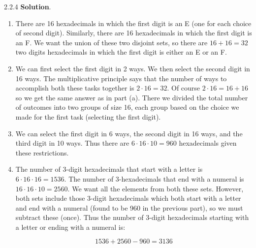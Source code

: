 \documentclass[11pt,]{book}
\theoremstyle{ptxplainnotitle}
\theoremstyle{ptxplaintitle}
\theoremstyle{ptxdefinitionnotitle}
\theoremstyle{ptxdefinitiontitle}
\theoremstyle{ptxdefinitionnotitle}
\theoremstyle{ptxdefinitiontitle}
\theoremstyle{ptxdefinitionnotitle}
\theoremstyle{ptxdefinitiontitle}
\theoremstyle{ptxdefinitiontitlenonumber}
\theoremstyle{ptxdefinitiontitlenonumber}
\numberwithin{equation}{chapter}
\begin{document}
\begin{divisionexercise}{2.2.4}
\textbf{Solution}.\quad%
\hypertarget{p-1081}{}%
\leavevmode%
\begin{enumerate}[label=\alph*.]
\item\hypertarget{li-472}{}\hypertarget{p-1082}{}%
There are 16 hexadecimals in which the first digit is an E (one for each choice of second digit). Similarly, there are 16 hexadecimals in which the first digit is an F. We want the union of these two disjoint sets, so there are \(16 + 16 = 32\) two digits hexadecimals in which the first digit is either an E or an F.%
\item\hypertarget{li-473}{}\hypertarget{p-1083}{}%
We can first select the first digit in 2 ways. We then select the second digit in 16 ways. The multiplicative principle says that the number of ways to accomplish both these tasks together is \(2 \cdot 16 = 32\text{.}\) Of course \(2 \cdot 16 = 16 + 16\) so we get the same answer as in part (a). There we divided the total number of outcomes into two groups of size 16, each group based on the choice we made for the first task (selecting the first digit).%
\item\hypertarget{li-474}{}\hypertarget{p-1084}{}%
We can select the first digit in 6 ways, the second digit in 16 ways, and the third digit in 10 ways. Thus there are \(6\cdot 16 \cdot 10 = 960\) hexadecimals given these restrictions.%
\item\hypertarget{li-475}{}\hypertarget{p-1085}{}%
The number of 3-digit hexadecimals that start with a letter is \(6 \cdot 16 \cdot 16 = 1536\text{.}\) The number of 3-hexadecimals that end with a numeral is \(16 \cdot 16 \cdot 10 = 2560\text{.}\) We want all the elements from both these sets. However, both sets include those 3-digit hexadecimals which both start with a letter and end with a numeral (found to be 960 in the previous part), so we must subtract these (once). Thus the number of 3-digit hexadecimals starting with a letter or ending with a numeral is:%
\par
\hypertarget{p-1086}{}%
%
\begin{equation*}
1536 + 2560 - 960 = 3136
\end{equation*}
%
\end{enumerate}
%
\end{divisionexercise}%
\end{document}
